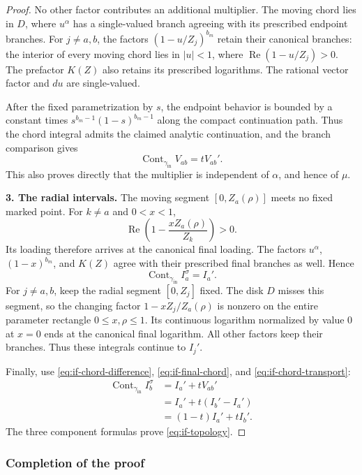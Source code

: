 \documentclass[12pt]{amsart}
\theoremstyle{definition}
\numberwithin{equation}{section}
\theoremstyle{definition}
\let\al\alpha
\let\gm\gamma
\let\si\sigma
\let\le\leqslant
\def\beq{\begin{equation}}
\def\eeq{\end{equation}}
\begin{document}
\begin{proof}
No other factor contributes an additional multiplier.
The moving chord lies in $D$, where $u^\al$ has a single-valued
branch agreeing with its prescribed endpoint branches.
For $j\ne a,b$, the factors $(1-u/Z_j)^{b_m}$ retain their canonical
branches: the interior of every moving chord lies in $|u|<1$,
where $\operatorname{Re}(1-u/Z_j)>0$.
The prefactor $K(Z)$ also retains its prescribed logarithms.
The rational vector factor and $du$ are single-valued.

After the fixed parametrization by $s$, the endpoint behavior is
bounded by a constant times $s^{b_m-1}(1-s)^{b_m-1}$ along the
compact continuation path. Thus the chord integral admits the
claimed analytic continuation, and the branch comparison gives
\beq\label{eq:if-chord-transport}
 \operatorname{Cont}_{\gm_{\mathrm{in}}}V_{ab}=tV_{ab}'.
\eeq
This also proves directly that the multiplier is independent of
$\al$, and hence of $\mu$.

\medskip\noindent
\textbf{3. The radial intervals.}
The moving segment $[0,Z_a(\rho)]$ meets no fixed marked point.
For $k\ne a$ and $0<x<1$,
\beq
 \operatorname{Re}\left(1-\frac{xZ_a(\rho)}{Z_k}\right)>0.
\eeq
Its loading therefore arrives at the canonical final loading.
The factors $u^\al$, $(1-x)^{b_m}$, and $K(Z)$ agree with their
prescribed final branches as well. Hence
\beq
 \operatorname{Cont}_{\gm_{\mathrm{in}}}I_a^\si=I_a'.
\eeq
For $j\ne a,b$, keep the radial segment $[0,Z_j]$ fixed.
The disk $D$ misses this segment, so the changing factor
$1-xZ_j/Z_a(\rho)$ is nonzero on the entire parameter rectangle
$0\le x,\rho\le1$. Its continuous logarithm normalized by value
$0$ at $x=0$ ends at the canonical final logarithm.
All other factors keep their branches. Thus these integrals
continue to $I_j'$.

Finally, use \eqref{eq:if-chord-difference},
\eqref{eq:if-final-chord}, and \eqref{eq:if-chord-transport}:
\beq
 \begin{aligned}
 \operatorname{Cont}_{\gm_{\mathrm{in}}}I_b^\si
 &=I_a'+tV_{ab}'\\
 &=I_a'+t(I_b'-I_a')\\
 &=(1-t)I_a'+tI_b'.
 \end{aligned}
\eeq
The three component formulas prove \eqref{eq:if-topology}.
\end{proof}

\subsubsection{Completion of the proof}
\end{document}
